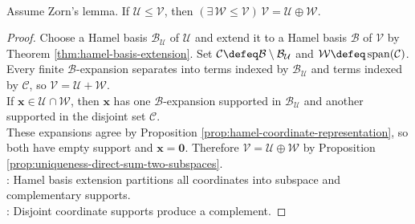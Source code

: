 \begin{theorem} \label{thm:complements-exist-arbitrary-vector-spaces} \\
Assume Zorn's lemma. If $\mathcal{U}\leq\mathcal{V}$, then $(\exists\,\mathcal{W}\leq\mathcal{V})\,\mathcal{V}=\mathcal{U}\oplus\mathcal{W}$.
\begin{proof}
Choose a Hamel basis $\mathcal{B}_{\mathcal{U}}$ of $\mathcal{U}$ and extend it to a Hamel basis $\mathcal{B}$ of $\mathcal{V}$ by Theorem \ref{thm:hamel-basis-extension}. Set $\mathcal{C}\defeq\mathcal{B}\setminus\mathcal{B}_{\mathcal{U}}$ and $\mathcal{W}\defeq\operatorname{span}(\mathcal{C})$.\\
Every finite $\mathcal{B}$-expansion separates into terms indexed by $\mathcal{B}_{\mathcal{U}}$ and terms indexed by $\mathcal{C}$, so $\mathcal{V}=\mathcal{U}+\mathcal{W}$.\\
If $\mathbf{x}\in\mathcal{U}\cap\mathcal{W}$, then $\mathbf{x}$ has one $\mathcal{B}$-expansion supported in $\mathcal{B}_{\mathcal{U}}$ and another supported in the disjoint set $\mathcal{C}$.\\
These expansions agree by Proposition \ref{prop:hamel-coordinate-representation}, so both have empty support and $\mathbf{x}=\mathbf{0}$. Therefore $\mathcal{V}=\mathcal{U}\oplus\mathcal{W}$ by Proposition \ref{prop:uniqueness-direct-sum-two-subspaces}.\\
: Hamel basis extension partitions all coordinates into subspace and complementary supports.\\
: Disjoint coordinate supports produce a complement.
\end{proof}
\end{theorem}

